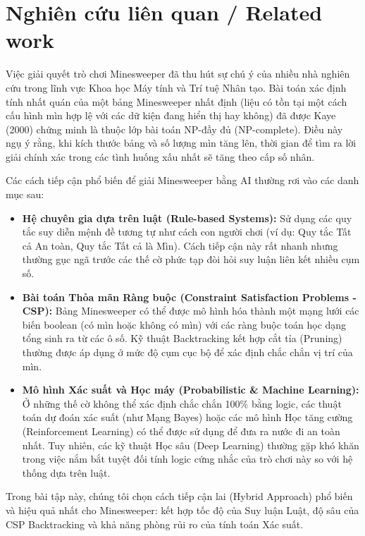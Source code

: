 \section{Nghiên cứu liên quan / Related work}

Việc giải quyết trò chơi Minesweeper đã thu hút sự chú ý của nhiều nhà nghiên cứu trong lĩnh vực Khoa học Máy tính và Trí tuệ Nhân tạo. Bài toán xác định tính nhất quán của một bảng Minesweeper nhất định (liệu có tồn tại một cách cấu hình mìn hợp lệ với các dữ kiện đang hiển thị hay không) đã được Kaye (2000) chứng minh là thuộc lớp bài toán NP-đầy đủ (NP-complete). Điều này ngụ ý rằng, khi kích thước bảng và số lượng mìn tăng lên, thời gian để tìm ra lời giải chính xác trong các tình huống xấu nhất sẽ tăng theo cấp số nhân.

Các cách tiếp cận phổ biến để giải Minesweeper bằng AI thường rơi vào các danh mục sau:
\begin{itemize}
    \item \textbf{Hệ chuyên gia dựa trên luật (Rule-based Systems):} Sử dụng các quy tắc suy diễn mệnh đề tương tự như cách con người chơi (ví dụ: Quy tắc Tất cả An toàn, Quy tắc Tất cả là Mìn). Cách tiếp cận này rất nhanh nhưng thường gục ngã trước các thế cờ phức tạp đòi hỏi suy luận liên kết nhiều cụm số.
    \item \textbf{Bài toán Thỏa mãn Ràng buộc (Constraint Satisfaction Problems - CSP):} Bảng Minesweeper có thể được mô hình hóa thành một mạng lưới các biến boolean (có mìn hoặc không có mìn) với các ràng buộc toán học dạng tổng sinh ra từ các ô số. Kỹ thuật Backtracking kết hợp cắt tỉa (Pruning) thường được áp dụng ở mức độ cụm cục bộ để xác định chắc chắn vị trí của mìn.
    \item \textbf{Mô hình Xác suất và Học máy (Probabilistic \& Machine Learning):} Ở những thế cờ không thể xác định chắc chắn 100\% bằng logic, các thuật toán dự đoán xác suất (như Mạng Bayes) hoặc các mô hình Học tăng cường (Reinforcement Learning) có thể được sử dụng để đưa ra nước đi an toàn nhất. Tuy nhiên, các kỹ thuật Học sâu (Deep Learning) thường gặp khó khăn trong việc nắm bắt tuyệt đối tính logic cứng nhắc của trò chơi này so với hệ thống dựa trên luật.
\end{itemize}

Trong bài tập này, chúng tôi chọn cách tiếp cận lai (Hybrid Approach) phổ biến và hiệu quả nhất cho Minesweeper: kết hợp tốc độ của Suy luận Luật, độ sâu của CSP Backtracking và khả năng phòng rủi ro của tính toán Xác suất.
